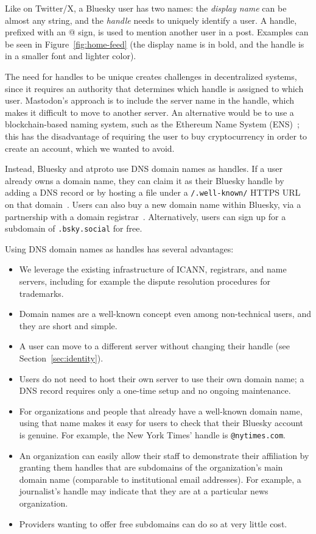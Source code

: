 \documentclass[sigconf,nonacm]{acmart}
\begin{document}
Like on Twitter/X, a Bluesky user has two names: the \emph{display name} can be almost any string, and the \emph{handle} needs to uniquely identify a user.
A handle, prefixed with an @ sign, is used to mention another user in a post.
Examples can be seen in Figure~\ref{fig:home-feed} (the display name is in bold, and the handle is in a smaller font and lighter color).

The need for handles to be unique creates challenges in decentralized systems, since it requires an authority that determines which handle is assigned to which user.
Mastodon's approach is to include the server name in the handle, which makes it difficult to move to another server.
An alternative would be to use a blockchain-based naming system, such as the Ethereum Name System (ENS)~\cite{ENS}; this has the disadvantage of requiring the user to buy cryptocurrency in order to create an account, which we wanted to avoid.

Instead, Bluesky and atproto use DNS domain names as handles.
If a user already owns a domain name, they can claim it as their Bluesky handle by adding a DNS record or by hosting a file under a \texttt{/.well-known/} HTTPS URL on that domain~\cite{DomainHandle}.
Users can also buy a new domain name within Bluesky, via a partnership with a domain registrar~\cite{PurchaseDomain}.
Alternatively, users can sign up for a subdomain of \texttt{.bsky.social} for free.

Using DNS domain names as handles has several advantages:
\begin{itemize}
    \item We leverage the existing infrastructure of ICANN, registrars, and name servers, including for example the dispute resolution procedures for trademarks.
    \item Domain names are a well-known concept even among non-technical users, and they are short and simple.
    \item A user can move to a different server without changing their handle (see Section~\ref{sec:identity}).
    \item Users do not need to host their own server to use their own domain name; a DNS record requires only a one-time setup and no ongoing maintenance.
    \item For organizations and people that already have a well-known domain name, using that name makes it easy for users to check that their Bluesky account is genuine. For example, the New York Times' handle is \texttt{@nytimes.com}.
    \item An organization can easily allow their staff to demonstrate their affiliation by granting them handles that are subdomains of the organization's main domain name (comparable to institutional email addresses). For example, a journalist's handle may indicate that they are at a particular news organization.
    \item Providers wanting to offer free subdomains can do so at very little cost.
\end{itemize}
\end{document}
